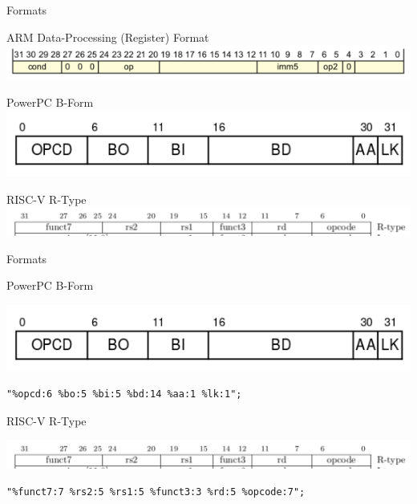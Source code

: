 \begin{frame}{Formats}

\centering
ARM Data-Processing (Register) Format
\includegraphics[width=\textwidth]{figures/format-arm}

\bigskip

PowerPC B-Form
\includegraphics[width=\textwidth]{figures/format-ppc}

\bigskip

RISC-V R-Type
\includegraphics[width=\textwidth]{figures/format-riscv}

\end{frame}

\begin{frame}[fragile]{Formats}

PowerPC B-Form

\includegraphics[width=\textwidth]{figures/format-ppc}

\begin{lstlisting}
"%opcd:6 %bo:5 %bi:5 %bd:14 %aa:1 %lk:1";
\end{lstlisting}

\bigskip

RISC-V R-Type

\includegraphics[width=\textwidth]{figures/format-riscv}

\begin{lstlisting}
"%funct7:7 %rs2:5 %rs1:5 %funct3:3 %rd:5 %opcode:7";
\end{lstlisting}

\end{frame}

